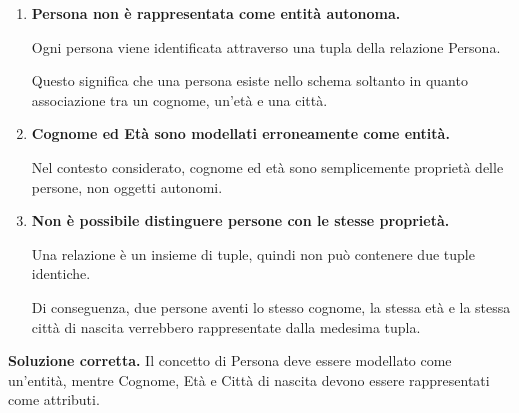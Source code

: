 \begin{enumerate}
    \item \textbf{Persona non è rappresentata
    come entità autonoma.}

    Ogni persona viene identificata attraverso
    una tupla della relazione Persona.

    Questo significa che una persona esiste
    nello schema soltanto in quanto associazione
    tra un cognome, un'età e una città.

    \item \textbf{Cognome ed Età sono modellati
    erroneamente come entità.}

    Nel contesto considerato, cognome ed età
    sono semplicemente proprietà delle persone,
    non oggetti autonomi.

    \item \textbf{Non è possibile distinguere
    persone con le stesse proprietà.}

    Una relazione è un insieme di tuple,
    quindi non può contenere due tuple identiche.

    Di conseguenza, due persone aventi lo stesso
    cognome, la stessa età e la stessa città
    di nascita verrebbero rappresentate
    dalla medesima tupla.
\end{enumerate}
\noindent
\textcolor{verdeEsempio}{\textbf{Soluzione corretta.}}
Il concetto di Persona deve essere modellato
come un'entità, mentre Cognome, Età e Città
di nascita devono essere rappresentati
come attributi.

\begin{center}
\end{center}



